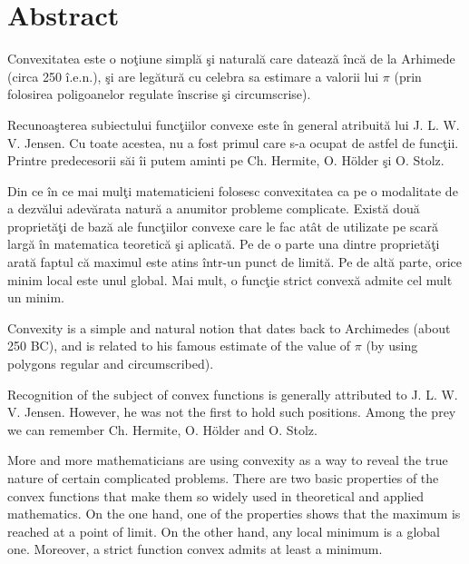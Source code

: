 \documentclass[a4paper,12pt,oneside]{report}
\begin{document}
\maketitle

\tableofcontents

\newpage
{}


\chapter*{Abstract}

Convexitatea este o no\c{t}iune simpl\u{a} \c{s}i natural\u{a} care dateaz\u{a} \^{i}nc\u{a} de la Arhimede (circa 250 \^{i}.e.n.), \c{s}i are leg\u{a}tur\u{a} cu celebra sa estimare a valorii lui \(\pi\) (prin folosirea poligoanelor regulate \^{i}nscrise \c{s}i circumscrise).

Recunoa\c{s}terea subiectului func\c{t}iilor convexe este \^{i}n general atribuit\u{a} lui J. L. W. V. Jensen. Cu toate acestea, nu a fost primul care s-a ocupat de astfel de func\c{t}ii. Printre predecesorii s\u{a}i \^{i}i putem aminti pe Ch. Hermite, O. Hölder \c{s}i O. Stolz.

Din ce \^{i}n ce mai mul\c{t}i matematicieni folosesc convexitatea ca pe o modalitate de a dezv\u{a}lui adev\u{a}rata natur\u{a} a anumitor probleme complicate. Exist\u{a} dou\u{a} propriet\u{a}\c{t}i de baz\u{a} ale func\c{t}iilor convexe care le fac at\^{a}t de utilizate pe scar\u{a} larg\u{a} \^{i}n matematica teoretic\u{a} \c{s}i aplicat\u{a}. Pe de o parte una dintre propriet\u{a}\c{t}i arat\u{a} faptul c\u{a} maximul este atins \^{i}ntr-un punct de limit\u{a}. Pe de alt\u{a} parte, orice minim local este unul global. Mai mult, o func\c{t}ie strict convex\u{a} admite cel mult un minim.

Convexity is a simple and  natural notion that dates back to Archimedes (about
250 BC), and is related to his famous estimate of the value of \(\pi\)  (by using polygons
regular and circumscribed).

Recognition of the subject of convex functions is generally attributed to J. L. W. V.
Jensen. However, he was not the first to hold such positions. Among the prey we can remember Ch. Hermite, O. Hölder and O. Stolz.

More and more mathematicians are using convexity as a way to
reveal the true nature of certain complicated problems. There are two basic properties
of the convex functions that make them so widely used in theoretical and applied mathematics. On the one hand, one of the properties shows that the maximum is reached at a point
of limit. On the other hand, any local minimum is a global one. Moreover, a strict function
convex admits at least a minimum.
\end{document}
